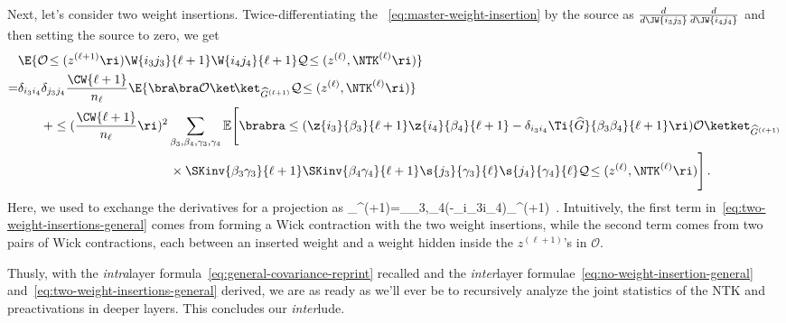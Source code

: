 Next, let's consider two weight insertions. Twice-differentiating the ~\eqref{eq:master-weight-insertion} by the source as $\frac{d}{d\JW{i_3j_3}}\frac{d}{d\JW{i_4j_4}}$ and then setting the source to zero, we get
\begin{align}\label{eq:two-weight-insertions-general}
&\E{\mathcal{O}\!\le(z^{(\ell+1)}\ri)\W{i_3j_3}{\ell+1}\W{i_4j_4}{\ell+1}\mathcal{Q}\!\le(z^{(\ell)},  \NTK^{(\ell)} \ri)}\, \\
=&\delta_{i_3i_4}\delta_{j_3j_4}\frac{\CW{\ell+1}}{n_{\ell}}\E{\bra\!\bra\mathcal{O}\ket\!\ket_{\widehat{G}^{(\ell+1)}}\mathcal{Q}\!\le(z^{(\ell)},  \NTK^{(\ell)}\ri) }\, \notag\\
&\quad\quad+\le(\frac{\CW{\ell+1}}{n_{\ell}}\ri)^2\sum_{\beta_3,\beta_4,\gamma_3,\gamma_4}\mathbb{E}\Bigg[\brabra\le(\z{i_3}{\beta_3}{\ell+1}\z{i_4}{\beta_4}{\ell+1}-\delta_{i_3i_4}\Ti{\widehat{G}}{\beta_3\beta_4}{\ell+1}\ri)\mathcal{O}\ketket_{\widehat{G}^{(\ell+1)}}\, \nonumber\\
&\quad \quad \quad \quad \quad \quad \quad \quad \quad \quad \quad \quad \times\SKinv{\beta_3\gamma_3}{\ell+1}\SKinv{\beta_4\gamma_4}{\ell+1}\s{j_3}{\gamma_3}{\ell}\s{j_4}{\gamma_4}{\ell}\mathcal{Q}\!\le(z^{(\ell)},  \NTK^{(\ell)}\ri) \Bigg]\, .\notag
\end{align}
Here, we used  to exchange the derivatives for a projection as
\be
\bra\!\!\!\bra{}\ket\!\!\!\ket_{^{(\ell+1)}}=\sum_{\beta_3,\beta_4}\brabra\le(-\delta_{i_3i_4}\ri)\ketket_{^{(\ell+1)}}\, .
\ee
Intuitively, the first term in~\eqref{eq:two-weight-insertions-general} comes from forming a Wick contraction with the two weight insertions, while the second term comes from two pairs of Wick contractions, each between an inserted weight and a weight hidden inside the $z^{(\ell+1)}$'s in $\mathcal{O}$.

Thusly, with the \emph{intra}layer formula~\eqref{eq:general-covariance-reprint} recalled and the \emph{inter}layer formulae~\eqref{eq:no-weight-insertion-general} and~\eqref{eq:two-weight-insertions-general} derived, we are as ready as we'll ever be to recursively analyze the joint statistics of the NTK and preactivations in deeper layers. This concludes our \emph{inter}lude.




